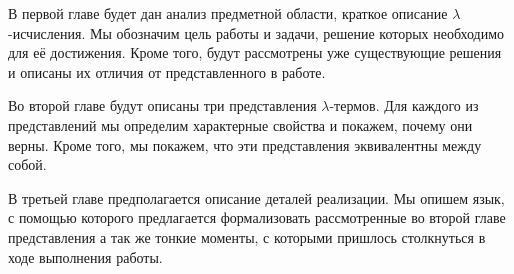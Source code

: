В первой главе будет дан анализ предметной области, краткое описание $\lambda$-исчисления. Мы обозначим цель работы и задачи, решение которых необходимо для её достижения. Кроме того, будут рассмотрены уже существующие решения и описаны их отличия от представленного в работе.

Во второй главе будут описаны три представления $\lambda$-термов. Для каждого из представлений мы определим характерные свойства и покажем, почему они верны. Кроме того, мы покажем, что эти представления эквивалентны между собой.

В третьей главе предполагается описание деталей реализации. Мы опишем язык, с помощью которого предлагается формализовать рассмотренные во второй главе представления а так же тонкие моменты, с которыми пришлось столкнуться в ходе выполнения работы.
